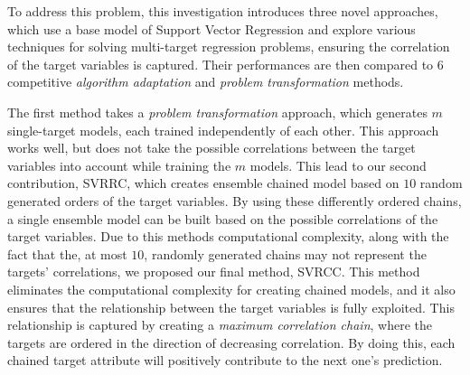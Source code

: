 \documentclass[preprint,12pt]{elsarticle}
\begin{document}
To address this problem, this investigation introduces three novel approaches, which use a base model of Support Vector Regression and explore various techniques for solving multi-target regression problems, ensuring the correlation of the target variables is captured. Their performances are then compared to $6$ competitive \textit{algorithm adaptation} and \textit{problem transformation} methods.

The first method takes a \textit{problem transformation} approach, which generates $m$ single-target models, each trained independently of each other. This approach works well, but does not take the possible correlations between the target variables into account while training the $m$ models. This lead to our second contribution, SVRRC, which creates ensemble chained model based on $10$ random generated orders of the target variables. By using these differently ordered chains, a single ensemble model can be built based on the possible correlations of the target variables. Due to this methods computational complexity, along with the fact that the, at most $10$, randomly generated chains may not represent the targets' correlations, we proposed our final method, SVRCC. This method eliminates the computational complexity for creating chained models, and it also ensures that the relationship between the target variables is fully exploited. This relationship is captured by creating a \textit{maximum correlation chain}, where the targets are ordered in the direction of decreasing correlation. By doing this, each chained target attribute will positively contribute to the next one's prediction.  
\end{document}
